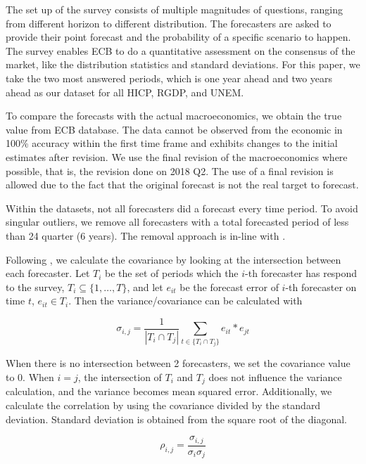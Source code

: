 \documentclass[11pt]{article}
\begin{document}
The set up of the survey consists of multiple magnitudes of questions, ranging from different horizon to different distribution. The forecasters are asked to provide their point forecast and the probability of a specific scenario to happen. The survey enables ECB to do a quantitative assessment on the consensus of the market, like the distribution statistics and standard deviations. For this paper, we take the two most answered periods, which is one year ahead and two years ahead as our dataset for all HICP, RGDP, and UNEM.

To compare the forecasts with the actual macroeconomics, we obtain the true value from ECB database. The data cannot be observed from the economic in 100\% accuracy within the first time frame and exhibits changes to the initial estimates after revision. We use the final revision of the macroeconomics where possible, that is, the revision done on 2018 Q2. The use of a final revision is allowed due to the fact that the original forecast is not the real target to forecast.

Within the datasets, not all forecasters did a forecast every time period. To avoid singular outliers, we remove all forecasters with a total forecasted period of less than 24 quarter (6 years). The removal approach is in-line with \cite{Matsypura2018}.

Following \cite{Matsypura2018}, we calculate the covariance by looking at the intersection between each forecaster. Let $T_i$ be the set of periods which the $i$-th forecaster has respond to the survey, $T_i \subseteq \{1,\ldots,T\}$, and let $e_{it}$ be the forecast error of $i$-th forecaster on time $t$, $e_{it} \in T_i$. Then the variance/covariance can be calculated with 


\begin{equation}
\label{equation}
\sigma_{i,j} = \frac{1}{|T_i \cap T_j|}\sum_{t\in \{T_i \cap T_j\}} e_{it}*e_{jt}
\end{equation}

When there is no intersection between 2 forecasters, we set the covariance value to 0. When $i=j$, the intersection of $T_i$ and $T_j$ does not influence the variance calculation, and the variance becomes mean squared error. Additionally, we calculate the correlation by using the covariance divided by the standard deviation. Standard deviation is obtained from the square root of the diagonal.

\begin{equation}
\label{eqn: cov2cor}
\rho_{i,j} = \frac{\sigma_{i,j}}{\sigma_{i}\sigma_{j}}
\end{equation}
\end{document}
